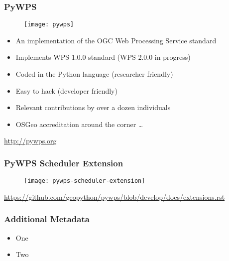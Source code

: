 \documentclass{beamer}
\begin{document}
\begin{frame}
\frametitle<presentation>{PyWPS}

  \begin{figure}[ht]
    \centering
    \texttt{[image: pywps]}
  \end{figure}

  \begin{itemize}
    \item An implementation of the OGC Web Processing Service standard
    \item Implements WPS 1.0.0 standard (WPS 2.0.0 in progress)
    \item Coded in the Python language (researcher friendly)
    \item Easy to hack (developer friendly)
    \item Relevant contributions by over a dozen individuals
    \item OSGeo accreditation around the corner \ldots
  \end{itemize}

  \vspace{0.2cm}
  \centering
  \footnotesize{\url{http://pywps.org}}

\end{frame}

\begin{frame}
\frametitle<presentation>{PyWPS Scheduler Extension}

  \begin{figure}[ht]
    \centering
    \texttt{[image: pywps-scheduler-extension]}
  \end{figure}

  \centering
  \footnotesize{\url{https://github.com/geopython/pywps/blob/develop/docs/extensions.rst}}

\end{frame}

\begin{frame}
\frametitle<presentation>{Additional Metadata}

  \begin{itemize}
    \item One
    \item Two
  \end{itemize}

\end{frame}
\end{document}
